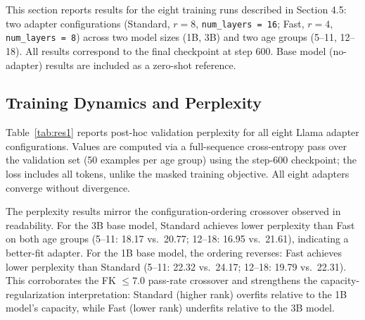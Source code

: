 \documentclass[ASNA,twocolumn]{USG} %
\begin{document}
This section reports results for the eight training runs described in Section 4.5: two adapter configurations (Standard, $r = 8$, \texttt{num\_layers = 16}; Fast, $r = 4$, \texttt{num\_layers = 8}) across two model sizes (1B, 3B) and two age groups (5--11, 12--18). All results correspond to the final checkpoint at step 600. Base model (no-adapter) results are included as a zero-shot reference.

\subsection{Training Dynamics and Perplexity}

Table~\ref{tab:res1} reports post-hoc validation perplexity for all eight Llama adapter configurations. Values are computed via a full-sequence cross-entropy pass over the validation set (50 examples per age group) using the step-600 checkpoint; the loss includes all tokens, unlike the masked training objective. All eight adapters converge without divergence.

The perplexity results mirror the configuration-ordering crossover observed in readability. For the 3B base model, Standard achieves lower perplexity than Fast on both age groups (5--11: 18.17 vs.\ 20.77; 12--18: 16.95 vs.\ 21.61), indicating a better-fit adapter. For the 1B base model, the ordering reverses: Fast achieves lower perplexity than Standard (5--11: 22.32 vs.\ 24.17; 12--18: 19.79 vs.\ 22.31). This corroborates the FK $\leq 7.0$ pass-rate crossover and strengthens the capacity-regularization interpretation: Standard (higher rank) overfits relative to the 1B model's capacity, while Fast (lower rank) underfits relative to the 3B model.
\end{document}
